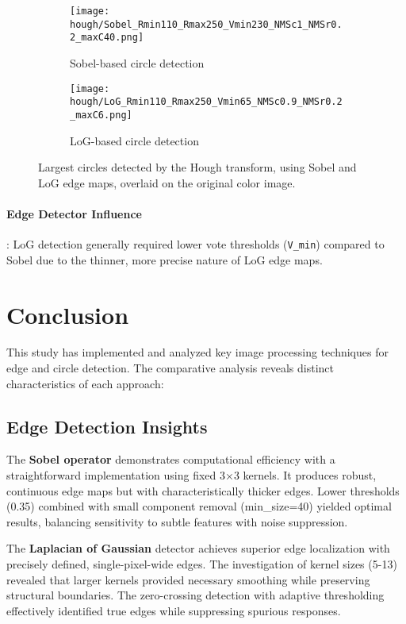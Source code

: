 \documentclass[12pt,a4paper]{article}
\begin{document}
\begin{figure}[H]
    \centering
    \begin{subfigure}{0.48\textwidth}
        \texttt{[image: hough/Sobel\_Rmin110\_Rmax250\_Vmin230\_NMSc1\_NMSr0.2\_maxC40.png]}
        \caption{Sobel-based circle detection}
    \end{subfigure}
    \hfill
    \begin{subfigure}{0.48\textwidth}
        \texttt{[image: hough/LoG\_Rmin110\_Rmax250\_Vmin65\_NMSc0.9\_NMSr0.2\_maxC6.png]}
        \caption{LoG-based circle detection}
    \end{subfigure}
    
    \caption{Largest circles detected by the Hough transform, using Sobel and LoG edge maps, overlaid on the original color image.}
    \label{fig:hough_circles}
\end{figure}


\paragraph{Edge Detector Influence}: LoG detection generally required lower vote thresholds (\texttt{V\_min}) compared to Sobel due to the thinner, more precise nature of LoG edge maps.


\section{Conclusion}

This study has implemented and analyzed key image processing techniques for edge and circle detection. The comparative analysis reveals distinct characteristics of each approach:

\subsection*{Edge Detection Insights}

The \textbf{Sobel operator} demonstrates computational efficiency with a straightforward implementation using fixed 3×3 kernels. It produces robust, continuous edge maps but with characteristically thicker edges. Lower thresholds (0.35) combined with small component removal (min\_size=40) yielded optimal results, balancing sensitivity to subtle features with noise suppression.

The \textbf{Laplacian of Gaussian} detector achieves superior edge localization with precisely defined, single-pixel-wide edges. The investigation of kernel sizes (5-13) revealed that larger kernels provided necessary smoothing while preserving structural boundaries. The zero-crossing detection with adaptive thresholding effectively identified true edges while suppressing spurious responses.
\end{document}

